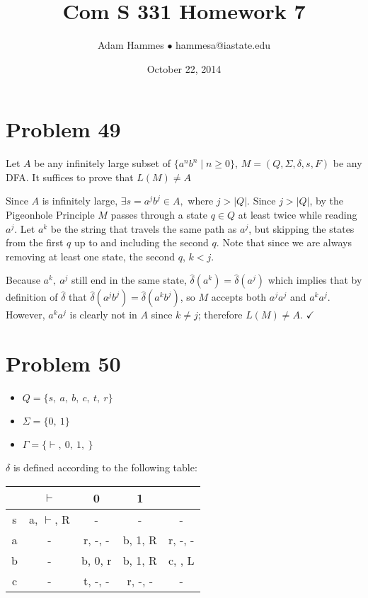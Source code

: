 \documentclass[11pt]{article}
\begin{document}
\title{Com S 331 Homework 7}
\author{Adam Hammes $\bullet$ hammesa@iastate.edu}
\date{October 22, 2014}
\maketitle

\section*{Problem 49}

Let $A$ be any infinitely large subset of $\{a^nb^n \mid n \geq 0\}$, $M = (Q, \Sigma, \delta, s, F)$ be any DFA. It suffices to prove that $L(M) \neq A$

 Since $A$ is infinitely large, $\exists s=a^jb^j \in A,$ where $j > |Q|$. Since $j > |Q|$, by the Pigeonhole Principle $M$ passes through a state $q \in Q$ at least twice while reading $a^j$. Let $a^k$ be the string that travels the same path as $a^j$, but skipping the states from the first $q$ up to and including the second $q$. Note that since we are always removing at least one state, the second $q$, $k < j$.

Because $a^k,\ a^j$ still end in the same state, $\hat{\delta}(a^k) = \hat{\delta}(a^j)$ which implies that by definition of $\hat{\delta}$ that $\hat{\delta}(a^jb^j) = \hat{\delta}(a^kb^j)$, so $M$ accepts both $a^ja^j$ and $a^ka^j$. However, $a^ka^j$ is clearly not in $A$ since $k \neq j$; therefore $L(M) \neq A$. $\checkmark$




\section*{Problem 50}

\begin{itemize}
	\item $Q = \{ s,\ a,\ b,\ c,\ t,\ r \}$
	\item $\Sigma = \{0,\ 1\}$
	\item $\Gamma = \{ \vdash,\ 0,\ 1,\ $\textvisiblespace$\}$
\end{itemize}

$\delta$ is defined according to the following table:

\begin{tabular}{ c | c | c | c | c }
			& $\vdash$ 			& 0 					& 1 				& \textvisiblespace \\
			\hline
	s		& a, $\vdash$, R 	& -					& -				& - \\
	a		& - 						& r, -, -				& b, 1, R		&  r, -, -\\
	b		& -						& b, 0, r			& b, 1, R		& c, \textvisiblespace , L \\
	c		& -						& t, -, -				& r, -, -			& -
\end{tabular}
\end{document}
